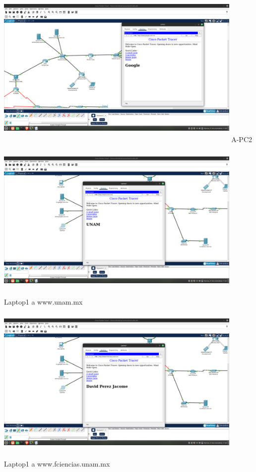 \documentclass[14pt]{book}
\begin{document}
\includegraphics[width=12cm, height=8cm]{images/prueba 2 siiiiiii.png} A-PC2\\

\includegraphics[width=12cm, height=8cm]{images/prueba 3 siiii.png} Laptop1 a www.unam.mx\\

\includegraphics[width=12cm, height=8cm]{images/prueba 4 siiiiiiii.png} Laptop1 a www.fciencias.unam.mx\\
\end{document}
